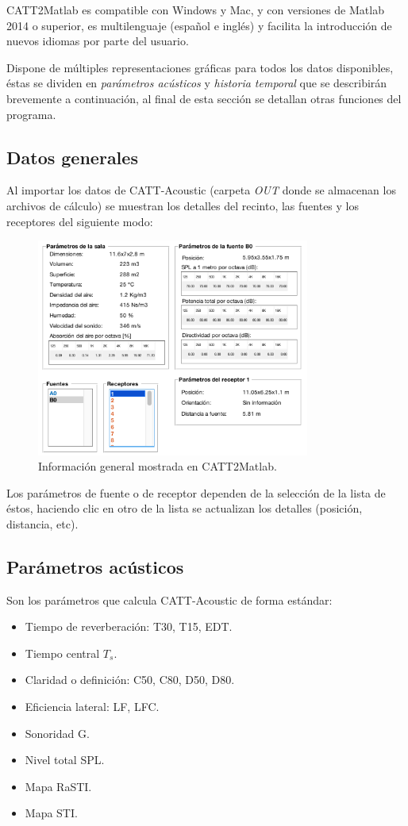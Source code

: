 CATT2Matlab es compatible con Windows y Mac, y con versiones de Matlab 2014 o superior, es multilenguaje (español e inglés) y facilita la introducción de nuevos idiomas por parte del usuario.

Dispone de múltiples representaciones gráficas para todos los datos disponibles, éstas se dividen en \textit{parámetros acústicos} y \textit{historia temporal} que se describirán brevemente a continuación, al final de esta sección se detallan otras funciones del programa.

\subsection{Datos generales}

Al importar los datos de CATT-Acoustic (carpeta \textit{OUT} donde se almacenan los archivos de cálculo) se muestran los detalles del recinto, las fuentes y los receptores del siguiente modo:

\begin{figure}[ht]
    \centering
    \includegraphics[width=0.8\textwidth]{archivos/capturas/catt2matlabgeneral}
    \caption{Información general mostrada en CATT2Matlab.}
\end{figure}
\FloatBarrier

Los parámetros de fuente o de receptor dependen de la selección de la lista de éstos, haciendo clic en otro de la lista se actualizan los detalles (posición, distancia, etc).

\subsection{Parámetros acústicos}

Son los parámetros que calcula CATT-Acoustic de forma estándar:
\begin{itemize}
\itemsep0em
	\item Tiempo de reverberación: T30, T15, EDT.
	\item Tiempo central $T_s$.
	\item Claridad o definición: C50, C80, D50, D80.
	\item Eficiencia lateral: LF, LFC.
	\item Sonoridad G.
	\item Nivel total SPL.
	\item Mapa RaSTI.
	\item Mapa STI.
\end{itemize}

